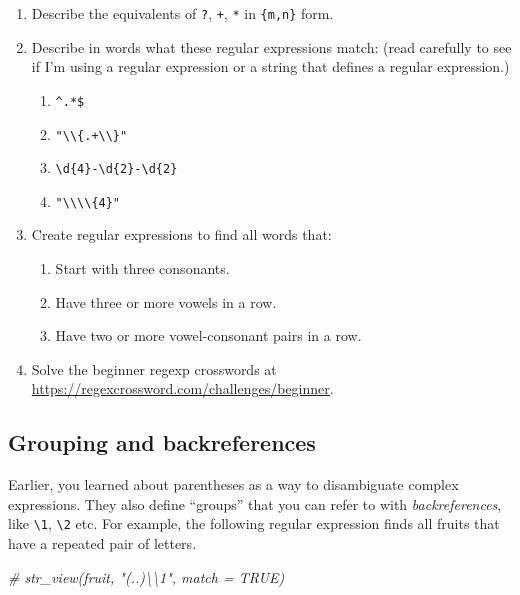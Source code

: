 \documentclass[]{book}
\newenvironment{Shaded}{\begin{snugshade}}{\end{snugshade}}
\newcommand{\CommentTok}[1]{\textcolor[rgb]{0.56,0.35,0.01}{\textit{{#1}}}}
\providecommand{\tightlist}{%
  \setlength{\itemsep}{0pt}\setlength{\parskip}{0pt}}
\begin{document}
\begin{enumerate}
\def\labelenumi{\arabic{enumi}.}
\item
  Describe the equivalents of \texttt{?}, \texttt{+}, \texttt{*} in
  \texttt{\{m,n\}} form.
\item
  Describe in words what these regular expressions match: (read
  carefully to see if I'm using a regular expression or a string that
  defines a regular expression.)

  \begin{enumerate}
  \def\labelenumii{\arabic{enumii}.}
  \tightlist
  \item
    \texttt{\^{}.*\$}
  \item
    \texttt{"\textbackslash{}\textbackslash{}\{.+\textbackslash{}\textbackslash{}\}"}
  \item
    \texttt{\textbackslash{}d\{4\}-\textbackslash{}d\{2\}-\textbackslash{}d\{2\}}
  \item
    \texttt{"\textbackslash{}\textbackslash{}\textbackslash{}\textbackslash{}\{4\}"}
  \end{enumerate}
\item
  Create regular expressions to find all words that:

  \begin{enumerate}
  \def\labelenumii{\arabic{enumii}.}
  \tightlist
  \item
    Start with three consonants.
  \item
    Have three or more vowels in a row.
  \item
    Have two or more vowel-consonant pairs in a row.
  \end{enumerate}
\item
  Solve the beginner regexp crosswords at
  \url{https://regexcrossword.com/challenges/beginner}.
\end{enumerate}

\subsection{Grouping and
backreferences}\label{grouping-and-backreferences}

Earlier, you learned about parentheses as a way to disambiguate complex
expressions. They also define ``groups'' that you can refer to with
\emph{backreferences}, like \texttt{\textbackslash{}1},
\texttt{\textbackslash{}2} etc. For example, the following regular
expression finds all fruits that have a repeated pair of letters.

\begin{Shaded}
\begin{Highlighting}[]
\CommentTok{# str_view(fruit, "(..)\textbackslash{}\textbackslash{}1", match = TRUE)}
\end{Highlighting}
\end{Shaded}
\end{document}
